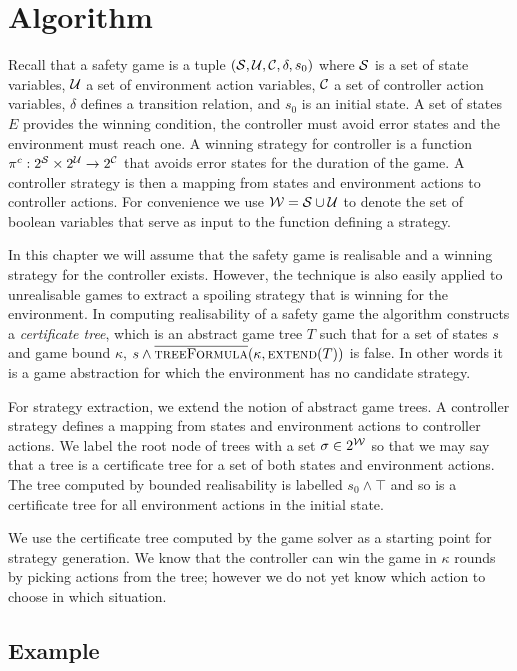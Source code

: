 \section{Algorithm}

Recall that a safety game is a tuple $(\mathcal{S}, \mathcal{U}, \mathcal{C}, \delta, s_0)$ where $\mathcal{S}$ is a set of state variables, $\mathcal{U}$ a set of environment action variables, $\mathcal{C}$ a set of controller action variables, $\delta$ defines a transition relation, and $s_0$ is an initial state. A set of states $E$ provides the winning condition, the controller must avoid error states and the environment must reach one. A winning strategy for controller is a function $\pi^c : 2^{\mathcal{S}} \times 2^{\mathcal{U}} \to 2^{\mathcal{C}}$ that avoids error states for the duration of the game. A controller strategy is then a mapping from states and environment actions to controller actions. For convenience we use $\mathcal{W} = \mathcal{S} \cup \mathcal{U}$ to denote the set of boolean variables that serve as input to the function defining a strategy.

In this chapter we will assume that the safety game is realisable and a winning strategy for the controller exists. However, the technique is also easily applied to unrealisable games to extract a spoiling strategy that is winning for the environment. In computing realisability of a safety game the algorithm constructs a \emph{certificate tree}, which is an abstract game tree $T$ such that for a set of states $s$ and game bound $\kappa$, $s \land \textsc{$\overline{\mbox{treeFormula}}$}(\kappa, \textsc{extend}(T))$ is false. In other words it is a game abstraction for which the environment has no candidate strategy.

For strategy extraction, we extend the notion of abstract game trees. A controller strategy defines a mapping from states and environment actions to controller actions. We label the root node of trees with a set $\sigma \in 2^{\mathcal{W}}$ so that we may say that a tree is a certificate tree for a set of both states and environment actions. The tree computed by bounded realisability is labelled $s_0 \land \top$ and so is a certificate tree for all environment actions in the initial state.

We use the certificate tree computed by the game solver as a starting point for strategy generation.  We know that the controller can win the game in $\kappa$ rounds by picking actions from the tree; however we do not yet know which action to choose in which situation.


\subsection{Example}

